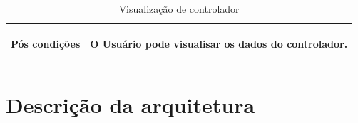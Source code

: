 \begin{table}[!htbp]
\begin{center}
\begin{tabularx}{\textwidth}{|>{\bfseries\raggedright\arraybackslash\center}m{5cm}|X|}
            Pós condições                                   & O Usuário pode visualisar os dados do controlador.                                                                                                                                                                                                                                       \\ \hline
        \end{tabularx}
        \caption{Visualização de controlador}
        \label{tab:uc5}
    \end{center}
\end{table}




\section{Descrição da arquitetura}\label{sec:descarc}

